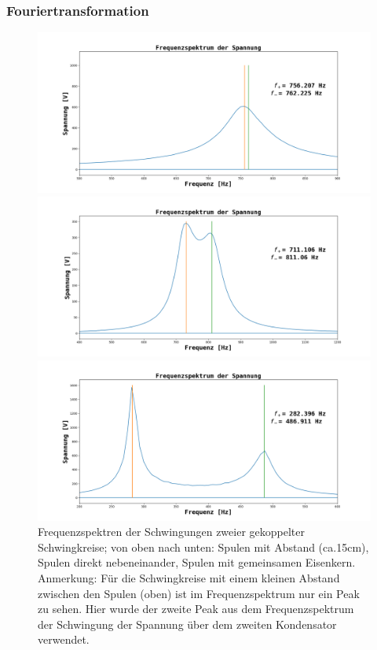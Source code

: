 \documentclass[12pt,a4paper]{article}
\begin{document}
\subsubsection{Fouriertransformation}
\begin{figure}
\begin{center}
\includegraphics[scale=0.36]{Bilder/Schwebung_Frequenzspektrum_Abstand.png}
\end{center}
\begin{center}
\includegraphics[scale=0.36]{Bilder/Schwebung_Frequenzspektrum.png}
\end{center}
\begin{center}
\includegraphics[scale=0.36]{Bilder/Schwebung_Frequenzspektrum_Eisenkern.png}
\end{center}
\caption[Frequenzspektrum Schwebung]{Frequenzspektren der Schwingungen zweier gekoppelter Schwingkreise; von oben nach unten: Spulen mit Abstand (ca.15cm), Spulen direkt nebeneinander, Spulen mit gemeinsamen Eisenkern. \\ Anmerkung: Für die Schwingkreise mit einem kleinen Abstand zwischen den Spulen (oben) ist im Frequenzspektrum nur ein Peak zu sehen. Hier wurde der zweite Peak aus dem Frequenzspektrum der Schwingung der Spannung über dem zweiten Kondensator verwendet.}
\label{fig:Schwebung_Frequenzspektrum}
\end{figure}
\end{document}
